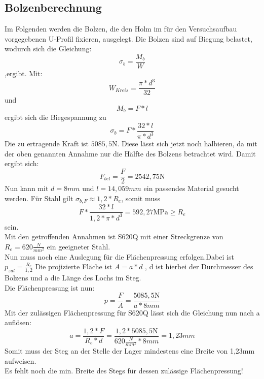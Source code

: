 
\subsection{Bolzenberechnung}
Im Folgenden werden die Bolzen, die den Holm im für den Versuchsaufbau vorgegebenen U-Profil fixieren, ausgelegt. Die Bolzen sind auf Biegung belastet, wodurch sich die Gleichung:
\begin{equation}
	\sigma_{b}=\frac{M_{b}}{W} 
\end{equation}
,ergibt.
 Mit: 
 \begin{equation}
 	W_{Kreis}=\frac{\pi*d^{3}}{32}
 \end{equation}
 und 
 \begin{equation}
 	M_{b}=F*l
 \end{equation}
 ergibt sich die Biegespannung zu
 \begin{equation}
 	\sigma_{b}=F*\frac{32*l}{\pi*d^{3}}
 \end{equation}
Die zu ertragende Kraft ist $5085,5 \mathrm{N}$. Diese lässt sich jetzt noch halbieren, da mit der oben genannten Annahme nur die Hälfte des Bolzens betrachtet wird. Damit ergibt sich:
 \begin{equation}
 	F_{bel}=\frac{F}{2} =2542,75 \mathrm{N}
 \end{equation}
 Nun kann mit $d=8mm$ und $l=14,059mm$ ein passendes Material gesucht werden. Für Stahl gilt $\sigma_{b,F}\approx1,2*R_{e}$, somit muss 
 \begin{equation}
 	F*\frac{32*l}{1,2*\pi*d^{3}}=592,27\mathrm{MPa}\geq
R_{e} \end{equation}  sein.\\

 Mit den getroffenden Annahmen ist S620Q mit einer Streckgrenze von $R_{e}=620\frac{N}{mm^{2}}$ ein geeigneter Stahl.\\
 
 \noindent Nun muss noch eine Auslegung für die Flächenpressung erfolgen.Dabei ist $p_{zul}=\frac{R_{e}}{1,2}$
Die projizierte Fläche ist $A=a*d$ , d ist hierbei der Durchmesser des Bolzens und a die Länge des Lochs im Steg.\\
Die Flächenpressung ist nun: 
\begin{equation}
	p=\frac{F}{A}=\frac{5085,5\mathrm{N}}{a*8mm}
\end{equation}
Mit der zulässigen Flächenpressung für S620Q lässt sich die Gleichung nun nach a auflösen:
\begin{equation}
	a=\frac{1,2*F}{R_{e}*d}=\frac{1,2*5085,5\mathrm{N}}{620\frac{N}{mm^{2}}*8mm}=1,23mm
\end{equation}
Somit muss der Steg an der Stelle der Lager mindestens eine Breite von 1,23$\mathrm{mm}$ aufweisen.\cite{item6}\\

\noindent Es fehlt noch die min. Breite des Stegs für dessen zulässige Flächenpressung!
 
 
 
 
  
 
